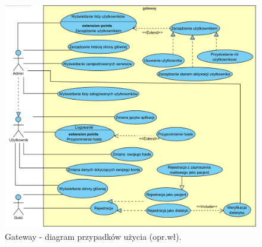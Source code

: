 \begin{minipage}{\textwidth}
    \begin{figure}[H]
        \centering\includegraphics[scale=0.55]{../uml/use_case_diagrams/gateway.png}
        \caption{Gateway - diagram przypadków użycia (opr.wł).}\label{rysunek:use-case-diagram-gateway}
    \end{figure}
\end{minipage}


